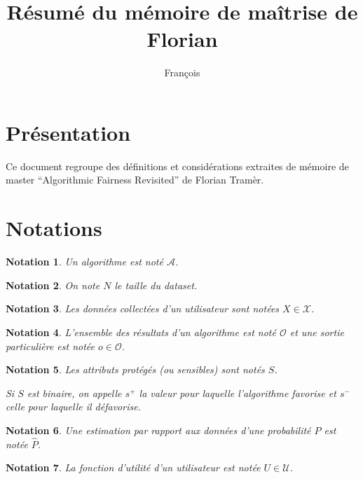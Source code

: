 \documentclass[draft]{article}
\title{Résumé du mémoire de maîtrise de Florian \bsc{Tramèr}}
\author{François \bsc{Bidet}}
\newtheorem*{myNot}{Notation}
\theoremstyle{definition}
\begin{document}
\maketitle


\section{Présentation}

Ce document regroupe des définitions et considérations extraites de mémoire de master ``Algorithmic Fairness Revisited'' de Florian Tramèr.


\section{Notations}

\begin{myNot}
  Un algorithme est noté $\mathcal{A}$.
\end{myNot}

\begin{myNot}
  On note $N$ le taille du dataset.
\end{myNot}

\begin{myNot}
  Les données collectées d'un utilisateur sont notées $X \in \mathcal{X}$.
\end{myNot}

\begin{myNot}
  L'ensemble des résultats d'un algorithme est noté $\mathcal{O}$ et une sortie particulière est notée $o \in \mathcal{O}$.
\end{myNot}

\begin{myNot}
  Les attributs protégés (ou sensibles) sont notés $S$.

  Si $S$ est binaire, on appelle $s^{+}$ la valeur pour laquelle l'algorithme favorise et $s^{-}$ celle pour laquelle il défavorise.
\end{myNot}

\begin{myNot}
  Une estimation par rapport aux données d'une probabilité $P$ est notée $\hat{P}$.
\end{myNot}

\begin{myNot}
  La fonction d'utilité d'un utilisateur est notée $U \in \mathcal{U}$.
\end{myNot}
\end{document}
